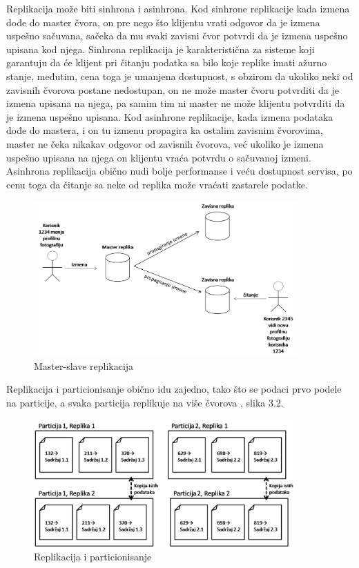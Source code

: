 \documentclass[12pt,oneside]{memoir}
\begin{document}
Replikacija može biti sinhrona i asinhrona. Kod sinhrone replikacije kada izmena dođe do master čvora, on pre nego što klijentu vrati odgovor da je izmena uspešno sačuvana, sačeka da mu svaki zavisni čvor potvrdi da je izmena uspešno upisana kod njega. Sinhrona replikacija je karakteristična za sisteme koji garantuju da će klijent pri čitanju podatka sa bilo koje replike imati ažurno stanje, međutim, cena toga je umanjena dostupnost, s obzirom da ukoliko neki od zavisnih čvorova postane nedostupan, on ne može master čvoru potvrditi da je izmena upisana na njega, pa samim tim ni master ne može klijentu potvrditi da je izmena uspešno upisana. Kod asinhrone replikacije, kada izmena podataka dođe do mastera, i on tu izmenu propagira ka ostalim zavisnim čvorovima, master ne čeka nikakav odgovor od zavisnih čvorova, već ukoliko je izmena uspešno upisana na njega on klijentu vraća potvrdu o sačuvanoj izmeni. Asinhrona replikacija obično nudi bolje performanse i veću dostupnost servisa, po cenu toga da čitanje sa neke od replika može vraćati zastarele podatke.


\begin{figure}[!ht]
  \centering
  \includegraphics[width=0.9\textwidth]{master-slave.png}
  \caption{Master-slave replikacija}
  \label{fig:grafikon}
\end{figure}

\pagebreak
Replikacija i particionisanje obično idu zajedno, tako što se podaci prvo podele na particije, a svaka particija replikuje na više čvorova \cite{ColumnarOriented}, slika 3.2. 

\begin{figure}[!ht]
  \centering
  \includegraphics[width=0.9\textwidth]{replica-partition.png}
  \caption{Replikacija i particionisanje}
  \label{fig:grafikon}
\end{figure}
\end{document}
